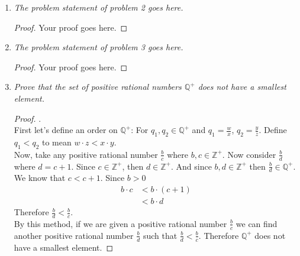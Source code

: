 \documentclass{amsart}
\begin{document}
\begin{enumerate}[1.]
\item \emph{The problem statement of problem 2 goes here.}
\begin{proof}
Your proof goes here.
\end{proof}


\newpage

\item \emph{The problem statement of problem 3 goes here.}
\begin{proof}
Your proof goes here.
\end{proof}


\newpage

\item \emph{Prove that the set of positive rational numbers $\mathbb{Q}^+$ does not have a smallest element.}
\begin{proof} .\\

First let's define an order on $\mathbb{Q}^+$:
For $q_1, q_2\in\mathbb{Q}^+$ and $q_1=\frac{w}{x}$, 
$q_2=\frac{y}{z}$. Define $q_1 < q_2$ to mean $w\cdot z < x\cdot y$. \\

Now, take any positive rational number $\frac{b}{c}$ 
where $b,c\in\mathbb{Z}^+$. Now consider $\frac{b}{d}$ where $d=c+1$. 
Since $c\in\mathbb{Z}^+$, then $d\in\mathbb{Z}^+$. And since 
$b,d\in\mathbb{Z}^+$ then $\frac{b}{d}\in\mathbb{Q}^+$. \\

We know that $c < c+1$. Since $b > 0$ 
\begin{align*}
    b\cdot c &< b\cdot(c+1) \\
    &< b\cdot d
\end{align*}
Therefore $\frac{b}{d}<\frac{b}{c}$. \\

By this method, if we are given
a positive rational number $\frac{b}{c}$ we can find another positive
rational number $\frac{b}{d}$ such that $\frac{b}{d}<\frac{b}{c}$.
Therefore $\mathbb{Q}^+$ does not have a smallest element.

\end{proof}

\end{enumerate}
\end{document}

